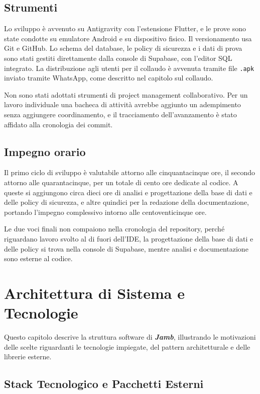 \documentclass[11pt]{article}
\numberwithin{figure}{section}
\begin{document}
\subsection{Strumenti}

Lo sviluppo è avvenuto su Antigravity con l'estensione Flutter, e le prove sono state condotte su emulatore Android e su dispositivo fisico. Il versionamento usa Git e GitHub. Lo schema del database, le policy di sicurezza e i dati di prova sono stati gestiti direttamente dalla console di Supabase, con l'editor SQL integrato. La distribuzione agli utenti per il collaudo è avvenuta tramite file \texttt{.apk} inviato tramite WhatsApp, come descritto nel capitolo sul collaudo.

Non sono stati adottati strumenti di project management collaborativo. Per un lavoro individuale una bacheca di attività avrebbe aggiunto un adempimento senza aggiungere coordinamento, e il tracciamento dell'avanzamento è stato affidato alla cronologia dei commit.

\subsection{Impegno orario}

Il primo ciclo di sviluppo è valutabile attorno alle cinquantacinque ore, il secondo attorno alle quarantacinque, per un totale di cento ore dedicate al codice. A queste si aggiungono circa dieci ore di analisi e progettazione della base di dati e delle policy di sicurezza, e altre quindici per la redazione della documentazione, portando l'impegno complessivo intorno alle centoventicinque ore.

Le due voci finali non compaiono nella cronologia del repository, perché riguardano lavoro svolto al di fuori dell'IDE, la progettazione della base di dati e delle policy si trova nella console di Supabase, mentre analisi e documentazione sono esterne al codice.

\section{Architettura di Sistema e Tecnologie}

Questo capitolo descrive la struttura software di \textbf{\textit{Jamb}}, illustrando le motivazioni delle scelte riguardanti le tecnologie impiegate, del pattern architetturale e delle librerie esterne.

\subsection{Stack Tecnologico e Pacchetti Esterni}
\end{document}

